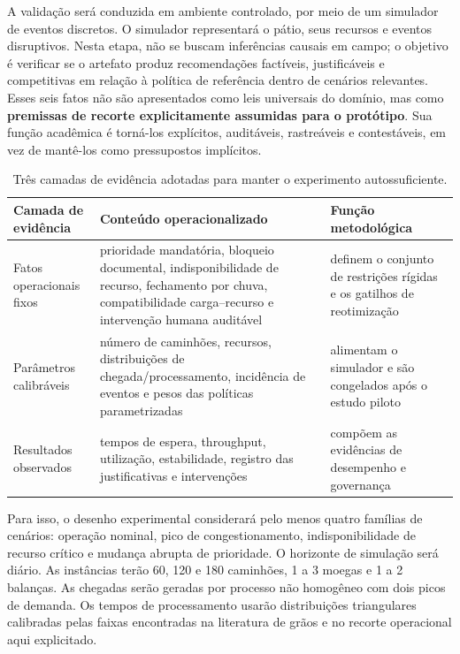 \documentclass[
  12pt,
  oneside,
  a4paper,
  sumario=tradicional,
  brazil
]{abntex2}
\begin{document}
A valida\c{c}\~ao ser\'a conduzida em ambiente controlado, por meio de um simulador de eventos discretos. O simulador representar\'a o p\'atio, seus recursos e eventos disruptivos. Nesta etapa, n\~ao se buscam infer\^encias causais em campo; o objetivo \'e verificar se o artefato produz recomenda\c{c}\~oes fact\'iveis, justific\'aveis e competitivas em rela\c{c}\~ao \`a pol\'itica de refer\^encia dentro de cen\'arios relevantes. Esses seis fatos n\~ao s\~ao apresentados como leis universais do dom\'inio, mas como \textbf{premissas de recorte explicitamente assumidas para o prot\'otipo}. Sua fun\c{c}\~ao acad\^emica \'e torn\'a-los expl\'icitos, audit\'aveis, rastre\'aveis e contest\'aveis, em vez de mant\^e-los como pressupostos impl\'icitos.

\begin{table}[H]
\centering
\small
\begin{tabular}{|p{}|p{}|p{}|}
\hline
\textbf{Camada de evid\^encia} & \textbf{Conte\'udo operacionalizado} & \textbf{Fun\c{c}\~ao metodol\'ogica} \\
\hline
Fatos operacionais fixos & prioridade mandat\'oria, bloqueio documental, indisponibilidade de recurso, fechamento por chuva, compatibilidade carga--recurso e interven\c{c}\~ao humana audit\'avel & definem o conjunto de restri\c{c}\~oes r\'igidas e os gatilhos de reotimiza\c{c}\~ao \\
\hline
Par\^ametros calibr\'aveis & n\'umero de caminh\~oes, recursos, distribui\c{c}\~oes de chegada/processamento, incid\^encia de eventos e pesos das pol\'iticas parametrizadas & alimentam o simulador e s\~ao congelados ap\'os o estudo piloto \\
\hline
Resultados observados & tempos de espera, throughput, utiliza\c{c}\~ao, estabilidade, registro das justificativas e interven\c{c}\~oes & comp\~oem as evid\^encias de desempenho e governan\c{c}a \\
\hline
\end{tabular}
\caption{Tr\^es camadas de evid\^encia adotadas para manter o experimento autossuficiente.}
\end{table}

Para isso, o desenho experimental considerar\'a pelo menos quatro fam\'ilias de cen\'arios: opera\c{c}\~ao nominal, pico de congestionamento, indisponibilidade de recurso cr\'itico e mudan\c{c}a abrupta de prioridade. O horizonte de simula\c{c}\~ao ser\'a di\'ario. As inst\^ancias ter\~ao 60, 120 e 180 caminh\~oes, 1 a 3 moegas e 1 a 2 balan\c{c}as. As chegadas ser\~ao geradas por processo n\~ao homog\^eneo com dois picos de demanda. Os tempos de processamento usar\~ao distribui\c{c}\~oes triangulares calibradas pelas faixas encontradas na literatura de gr\~aos e no recorte operacional aqui explicitado.
\end{document}

